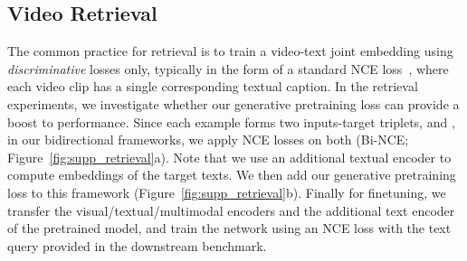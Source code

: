 \documentclass[10pt,twocolumn,letterpaper]{article}
\begin{document}

\subsection{Video Retrieval}

The common practice for retrieval is to train a video-text joint embedding using \textit{discriminative} losses only, typically in the form of a standard NCE loss~\cite{gutmann2010noise}, where each video clip has a single corresponding textual caption.
In the retrieval experiments, we investigate whether our generative pretraining loss can provide a boost to performance.
Since each example forms two inputs-target triplets, \ie  and , in our bidirectional frameworks, we apply NCE losses on both (Bi-NCE; Figure~\ref{fig:supp_retrieval}a). Note that we use an additional textual encoder to compute embeddings of the target texts. 
We then add our generative pretraining loss to this framework (Figure~\ref{fig:supp_retrieval}b).
Finally for finetuning, we transfer the visual/textual/multimodal encoders and the additional text encoder of the pretrained model, and train the network using an NCE loss with the text query provided in the downstream benchmark.
\end{document}
